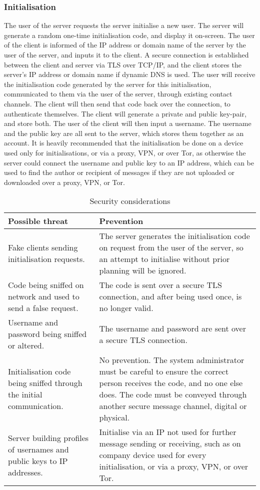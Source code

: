 \documentclass{article}
\begin{document}
\subsubsection{Initialisation}
The user of the server requests the server initialise a new user. The server will generate a random one-time initialisation code, and display it on-screen. The user of the client is informed of the IP address or domain name of the server by the user of the server, and inputs it to the client. A secure connection is established between the client and server via TLS over TCP/IP, and the client stores the server's IP address or domain name if dynamic DNS is used. The user will receive the initialisation code generated by the server for this initialisation, communicated to them via the user of the server, through existing contact channels. The client will then send that code back over the connection, to authenticate themselves. The client will generate a private and public key-pair, and store both. The user of the client will then input a username. The username and the public key are all sent to the server, which stores them together as an account. It is heavily recommended that the initialisation be done on a device used only for initialisations, or via a proxy, VPN, or over Tor, as otherwise the server could connect the username and public key to an IP address, which can be used to find the author or recipient of messages if they are not uploaded or downloaded over a proxy, VPN, or Tor.
\begin{table}[H]
    \centering
    \caption{Security considerations}
    \vspace{0.2cm}
    \begin{tabular}{p{}p{}}
    \toprule
    \textbf{Possible threat} & \textbf{Prevention}\\
    \midrule
    Fake clients sending initialisation requests. & The server generates the initialisation code on request from the user of the server, so an attempt to initialise without prior planning will be ignored.\\
    \midrule
    Code being sniffed on network and used to send a false request. & The code is sent over a secure TLS connection, and after being used once, is no longer valid.\\
    \midrule
    Username and password being sniffed or altered. & The username and password are sent over a secure TLS connection.\\
    \midrule
    Initialisation code being sniffed through the initial communication. & No prevention. The system administrator must be careful to ensure the correct person receives the code, and no one else does. The code must be conveyed through another secure message channel, digital or physical.\\
    \midrule
    Server building profiles of usernames and public keys to IP addresses. & Initialise via an IP not used for further message sending or receiving, such as on company device used for every initialisation, or via a proxy, VPN, or over Tor.\\
    \bottomrule
    \end{tabular}
    \label{tab:secconsinit}
\end{table}
\end{document}
